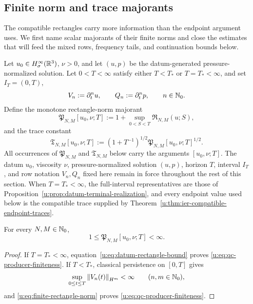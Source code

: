 \subsection{Finite norm and trace majorants}

The compatible rectangles carry more information than the endpoint argument
uses.  We first name scalar majorants of their finite norms and close the estimates that will
feed the mixed rows, frequency tails, and continuation bounds below.

\begin{definition}
\label{u:def:qc-producer-constants}
Let \(u_0\in H^\infty_\sigma(\mathbb R^3)\), \(\nu>0\), and let \((u,p)\) be the
datum-generated pressure-normalized solution.  Let \(0<T<\infty\) satisfy
either \(T<T_*\) or \(T=T_*<\infty\), and set
\(I_T=(0,T)\),
\[
 V_n:=\partial_t^n u,
 \qquad
 Q_n:=\partial_t^n p,
 \qquad n\in\mathbb N_0.
\]
Define the monotone rectangle-norm majorant
\begin{equation}
 \mathfrak P_{N,M}[u_0,\nu;T]
 :=1+\sup_{0<S<T}\mathfrak R_{N,M}(u;S),
 \label{u:eq:qc-producer-constant}
\end{equation}
and the trace constant
\begin{equation}
 \mathfrak T_{N,M}[u_0,\nu;T]
 :=\left(1+T^{-1}\right)^{1/2}
   \mathfrak P_{N,M}[u_0,\nu;T]^{1/2}.
 \label{u:eq:qc-trace-constant}
\end{equation}
All occurrences of \(\mathfrak P_{N,M}\) and \(\mathfrak T_{N,M}\) below
carry the arguments \([u_0,\nu;T]\).
The datum \(u_0\), viscosity \(\nu\), pressure-normalized solution
\((u,p)\), horizon \(T\), interval \(I_T\), and row notation \(V_n,Q_n\)
fixed here remain in force throughout the rest of this section.
When \(T=T_*<\infty\), the full-interval representatives are those of
Proposition~\ref{u:prop:datum-terminal-realization}, and every endpoint value
used below is the compatible trace supplied by
Theorem~\ref{u:thm:ier-compatible-endpoint-traces}.
\end{definition}

\begin{lemma}
\label{u:lem:qc-producer-finiteness}
For every \(N,M\in\mathbb N_0\),
\begin{equation}
 1\le \mathfrak P_{N,M}[u_0,\nu;T]<\infty.
 \label{u:eq:qc-producer-finiteness}
\end{equation}
\end{lemma}

\begin{proof}
If \(T=T_*<\infty\), equation~\eqref{u:eq:datum-rectangle-bound} proves
\eqref{u:eq:qc-producer-finiteness}.  If \(T<T_*\), classical persistence on
\([0,T]\) gives
\[
 \sup_{0\le t\le T}\left\lVert V_n(t)\right\rVert_{H^m}<\infty
 \qquad(n,m\in\mathbb N_0),
\]
and \eqref{u:eq:finite-rectangle-norm} proves
\eqref{u:eq:qc-producer-finiteness}.
\end{proof}

